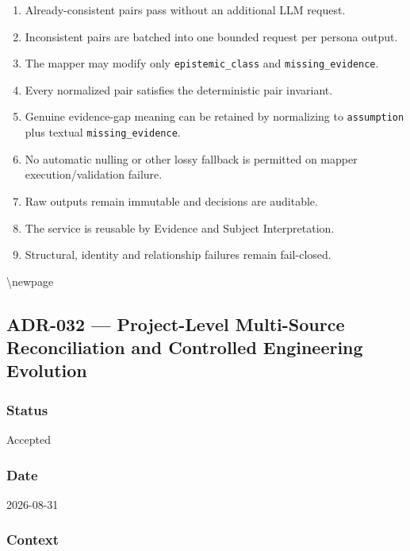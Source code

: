 \begin{enumerate}
\def\labelenumi{\arabic{enumi}.}
\tightlist
\item
  Already-consistent pairs pass without an additional LLM request.
\item
  Inconsistent pairs are batched into one bounded request per persona output.
\item
  The mapper may modify only \texttt{epistemic\_class} and \texttt{missing\_evidence}.
\item
  Every normalized pair satisfies the deterministic pair invariant.
\item
  Genuine evidence-gap meaning can be retained by normalizing to \texttt{assumption} plus textual \texttt{missing\_evidence}.
\item
  No automatic nulling or other lossy fallback is permitted on mapper execution/validation failure.
\item
  Raw outputs remain immutable and decisions are auditable.
\item
  The service is reusable by Evidence and Subject Interpretation.
\item
  Structural, identity and relationship failures remain fail-closed.
\end{enumerate}

\textbackslash newpage

\hypertarget{adr-032--project-level-multi-source-reconciliation-and-controlled-engineering-evolution}{%
\subsection{ADR-032 --- Project-Level Multi-Source Reconciliation and Controlled Engineering Evolution}\label{adr-032--project-level-multi-source-reconciliation-and-controlled-engineering-evolution}}

\hypertarget{status-11}{%
\subsubsection{Status}\label{status-11}}

Accepted

\hypertarget{date-11}{%
\subsubsection{Date}\label{date-11}}

2026-08-31

\hypertarget{context-18}{%
\subsubsection{Context}\label{context-18}}

